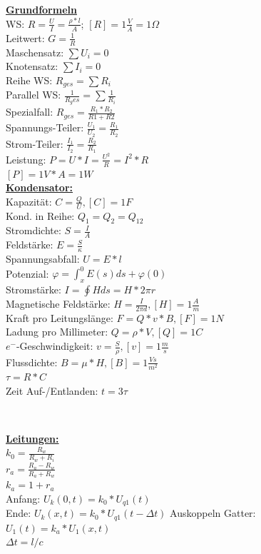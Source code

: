 \documentclass[11pt]{article}
\begin{document}
\begin{landscape}

\begin{minipage}{0.45\textwidth}
\underline{\textbf{Grundformeln}}\\
WS: $R = \frac{U}{I} = \frac{\rho * l}{A}$; $[R] = 1\frac{V}{A} =1 \Omega$ \\
Leitwert: $G = \frac{1}{R}$\\
Maschensatz: $\sum U_i = 0$\\
Knotensatz: $\sum I_i = 0$\\
Reihe WS: $R_{ges} = \sum R_i$\\
Parallel WS: $\frac{1}{R_ges} = \sum \frac{1}{R_i}$\\
\phantom{ss} Spezialfall: $R_{ges} = \frac{R_1 * R_2}{R1+R2} $\\
Spannungs-Teiler: $\frac{U_1}{U_2} = \frac{R_1}{R_2}$\\
Strom-Teiler: $\frac{I_1}{I_2} = \frac{R_2}{R_1}$\\
Leistung: $P =U*I = \frac{U^2}{R} = I^2*R $ \\
\phantom{ssssssssss} $[P] = 1V*A =1 W$\\
\underline{\textbf{Kondensator:}}\\
Kapazität: $C = \frac{Q}{U}, [C]=1F$\\
Kond. in Reihe: $Q_1 = Q_2 = Q_{12}$\\
Stromdichte: $S=\frac{I}{A}$\\
Feldstärke: $E=\frac{S}{\kappa}$\\
Spannungsabfall: $U=E*l$\\
Potenzial: $\varphi = \int_x^0 E(s)ds + \varphi(0)$\\
Stromstärke: $I = \oint H ds = H * 2\pi r$\\
Magnetische Feldstärke: $H = \frac{I}{2\pi d}, [H] = 1\frac{A}{m}$\\
Kraft pro Leitungslänge: $F=Q*v*B, [F] = 1N$\\
Ladung pro Millimeter: $Q = \rho * V, [Q] = 1C$\\
$e^-$-Geschwindigkeit: $v = \frac{S}{\rho}, [v] = 1\frac{m}{s}$\\
Flussdichte: $B=\mu*H, [B] = 1 \frac{Vs}{m^2}$\\

$\tau = R*C$\\
Zeit Auf-/Entlanden: $t = 3\tau$\\

\end{minipage}%
~~~~~~~
\begin{minipage}{0.3\textwidth}
\underline{\textbf{Leitungen:}}\\
$k_0 = \frac{R_w}{R_w + R_i} $\\
$r_a = \frac{R_a - R_w}{R_a + R_w} $\\
$k_a = 1 + r_a$\\
Anfang: $U_k(0,t)=k_0*U_{q1}(t)$\\
Ende: $U_k(x,t)= k_0*U_{q1}(t-\Delta t)$
Auskoppeln Gatter:\\
\phantom{ss} $U_1(t) = k_a * U_1(x,t)$\\
$\Delta t = l/c$\\


\end{minipage}
\end{landscape}
\end{document}
